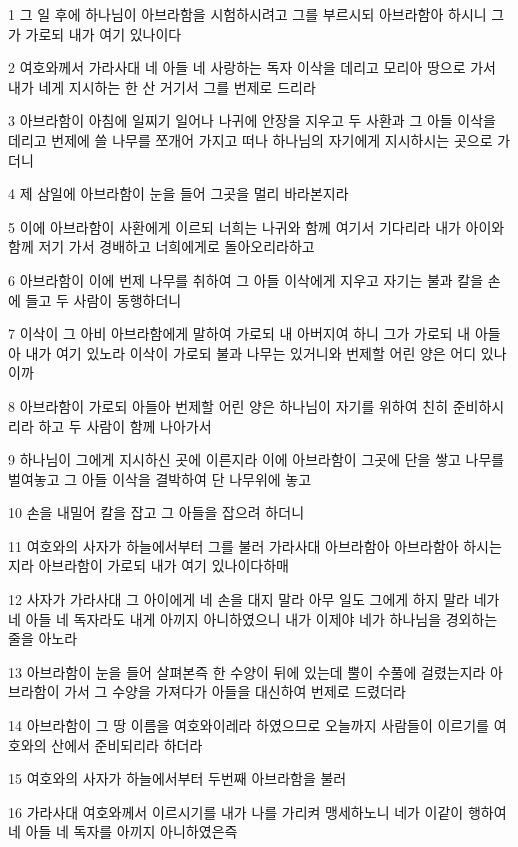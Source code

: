 \par 1 그 일 후에 하나님이 아브라함을 시험하시려고 그를 부르시되 아브라함아 하시니 그가 가로되 내가 여기 있나이다
\par 2 여호와께서 가라사대 네 아들 네 사랑하는 독자 이삭을 데리고 모리아 땅으로 가서 내가 네게 지시하는 한 산 거기서 그를 번제로 드리라
\par 3 아브라함이 아침에 일찌기 일어나 나귀에 안장을 지우고 두 사환과 그 아들 이삭을 데리고 번제에 쓸 나무를 쪼개어 가지고 떠나 하나님의 자기에게 지시하시는 곳으로 가더니
\par 4 제 삼일에 아브라함이 눈을 들어 그곳을 멀리 바라본지라
\par 5 이에 아브라함이 사환에게 이르되 너희는 나귀와 함께 여기서 기다리라 내가 아이와 함께 저기 가서 경배하고 너희에게로 돌아오리라하고
\par 6 아브라함이 이에 번제 나무를 취하여 그 아들 이삭에게 지우고 자기는 불과 칼을 손에 들고 두 사람이 동행하더니
\par 7 이삭이 그 아비 아브라함에게 말하여 가로되 내 아버지여 하니 그가 가로되 내 아들아 내가 여기 있노라 이삭이 가로되 불과 나무는 있거니와 번제할 어린 양은 어디 있나이까
\par 8 아브라함이 가로되 아들아 번제할 어린 양은 하나님이 자기를 위하여 친히 준비하시리라 하고 두 사람이 함께 나아가서
\par 9 하나님이 그에게 지시하신 곳에 이른지라 이에 아브라함이 그곳에 단을 쌓고 나무를 벌여놓고 그 아들 이삭을 결박하여 단 나무위에 놓고
\par 10 손을 내밀어 칼을 잡고 그 아들을 잡으려 하더니
\par 11 여호와의 사자가 하늘에서부터 그를 불러 가라사대 아브라함아 아브라함아 하시는지라 아브라함이 가로되 내가 여기 있나이다하매
\par 12 사자가 가라사대 그 아이에게 네 손을 대지 말라 아무 일도 그에게 하지 말라 네가 네 아들 네 독자라도 내게 아끼지 아니하였으니 내가 이제야 네가 하나님을 경외하는 줄을 아노라
\par 13 아브라함이 눈을 들어 살펴본즉 한 수양이 뒤에 있는데 뿔이 수풀에 걸렸는지라 아브라함이 가서 그 수양을 가져다가 아들을 대신하여 번제로 드렸더라
\par 14 아브라함이 그 땅 이름을 여호와이레라 하였으므로 오늘까지 사람들이 이르기를 여호와의 산에서 준비되리라 하더라
\par 15 여호와의 사자가 하늘에서부터 두번째 아브라함을 불러
\par 16 가라사대 여호와께서 이르시기를 내가 나를 가리켜 맹세하노니 네가 이같이 행하여 네 아들 네 독자를 아끼지 아니하였은즉

